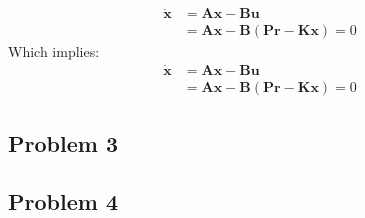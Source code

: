 \begin{align*}
  \dot{\boldsymbol{x}} &= \boldsymbol{Ax} - \boldsymbol{Bu} \\
                       &= \boldsymbol{Ax} -
                         \boldsymbol{B}(\boldsymbol{Pr} -
                         \boldsymbol{Kx}) = 0
\end{align*}
Which implies:
\begin{align*}
  \dot{\boldsymbol{x}} &= \boldsymbol{Ax} - \boldsymbol{Bu} \\
                       &= \boldsymbol{Ax} -
                         \boldsymbol{B}(\boldsymbol{Pr} -
                         \boldsymbol{Kx}) = 0
\end{align*}
\subsection{Problem 3}
\subsection{Problem 4}

